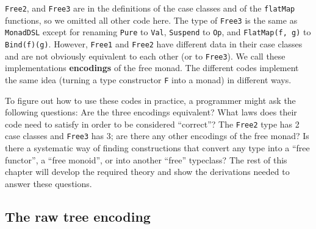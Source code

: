 \lstinline!Free2!, and
\lstinline!Free3! are in
the definitions of the case classes and of the \lstinline!flatMap!
functions, so we omitted all other code here. The type of \lstinline!Free3!
is the same as \lstinline!MonadDSL!
except for renaming \lstinline!Pure!
to \lstinline!Val!, \lstinline!Suspend!
to \lstinline!Op!, and
\lstinline!FlatMap(f, g)!
to \lstinline!Bind(f)(g)!.
However, \lstinline!Free1!
and \lstinline!Free2! have
different data in their case classes and are not obviously equivalent
to each other (or to \lstinline!Free3!).
We call these implementations \textbf{encodings}
of the free monad. The different codes implement the same idea (turning
a type constructor \lstinline!F!
into a monad) in different ways.

To figure out how to use these codes in practice, a programmer might
ask the following questions: Are the three encodings equivalent? What
laws does their code need to satisfy in order to be considered \textsf{``}correct\textsf{''}?
The \lstinline!Free2! type
has 2 case classes and \lstinline!Free3!
has 3; are there any other encodings of the free monad? Is there a
systematic way of finding constructions that convert any type into
a \textsf{``}free functor\textsf{''}, a \textsf{``}free monoid\textsf{''}, or into another \textsf{``}free\textsf{''}
typeclass? The rest of this chapter will develop the required theory
and show the derivations needed to answer these questions. 

\subsection{The raw tree encoding}

